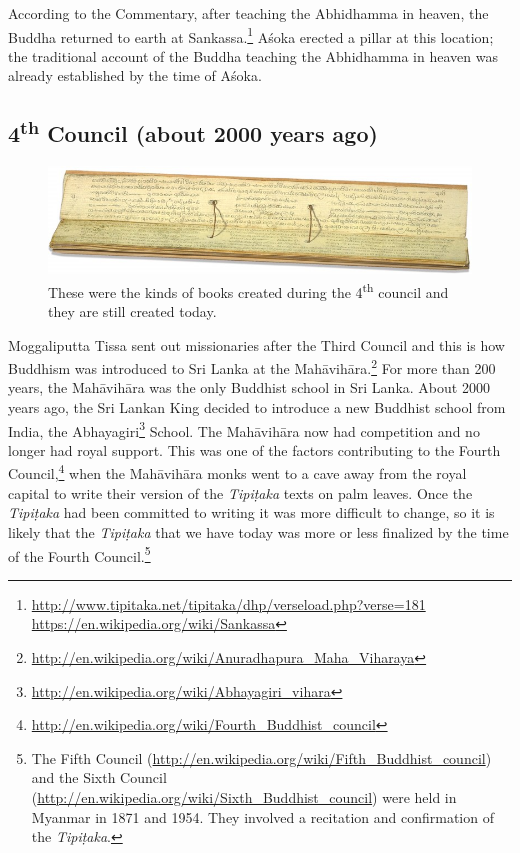 According to the Commentary, after teaching the Abhidhamma in heaven, the Buddha returned to earth at Sankassa.\footnote{\url{http://www.tipitaka.net/tipitaka/dhp/verseload.php?verse=181} \\ \url{https://en.wikipedia.org/wiki/Sankassa}} Aśoka erected a pillar at this location; the traditional account of the Buddha teaching the Abhidhamma in heaven was already established by the time of Aśoka.

\subsection*{4\textsuperscript{th} Council (about 2000 years ago)}

\begin{figure}[H]
\centering
\includegraphics[width=1.0\linewidth]{./Diagrams/Palm}
\caption{These were the kinds of books created during the 4\textsuperscript{th} council and they are still created today.}
\label{fig:Palm}
\end{figure}

Moggaliputta Tissa sent out missionaries after the Third Council and this is how Buddhism was introduced to Sri Lanka at the Mahāvihāra.\footnote{\url{http://en.wikipedia.org/wiki/Anuradhapura_Maha_Viharaya}} For more than 200 years, the Mahāvihāra was the only Buddhist school in Sri Lanka. About 2000 years ago, the Sri Lankan King decided to introduce a new Buddhist school from India, the Abhayagiri\footnote{\url{http://en.wikipedia.org/wiki/Abhayagiri_vihara}} School. The Mahāvihāra now had competition and no longer had royal support. This was one of the factors contributing to the Fourth Council,\footnote{\url{http://en.wikipedia.org/wiki/Fourth_Buddhist_council}} when the Mahāvihāra monks went to a cave away from the royal capital to write their version of the \textit{Tipiṭaka} texts on palm leaves. Once the \textit{Tipiṭaka} had been committed to writing it was more difficult to change, so it is likely that the \textit{Tipiṭaka} that we have today was more or less finalized by the time of the Fourth Council.\footnote{The Fifth Council (\url{http://en.wikipedia.org/wiki/Fifth_Buddhist_council}) and the Sixth Council (\url{http://en.wikipedia.org/wiki/Sixth_Buddhist_council}) were held in Myanmar in 1871 and 1954. They involved a recitation and confirmation of the \textit{Tipiṭaka}.}


